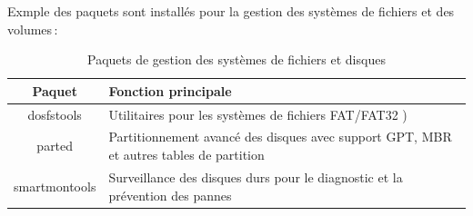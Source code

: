 Exmple des paquets  sont installés pour la gestion des systèmes de fichiers et des volumes :
\begin{table}[H]
    \centering
    \begin{tabular}{|c|p{8cm}|}
        \hline
        \textbf{Paquet}  & \textbf{Fonction principale} \\
        \hline
       
        dosfstools  & Utilitaires pour les systèmes de fichiers FAT/FAT32 ) \\
        \hline
        parted  & Partitionnement avancé des disques avec support GPT, MBR et autres tables de partition \\
        \hline
        smartmontools  & Surveillance  des disques durs pour le diagnostic et la prévention des pannes \\
        \hline
       
    \end{tabular}
    \caption{Paquets de gestion des systèmes de fichiers et disques}
    \label{tab:fs-disk}
\end{table}  

       
       




